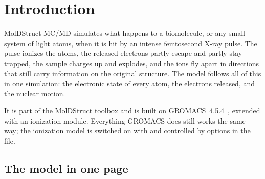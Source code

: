 \chapter{Introduction}
\label{ch:intro}

MolDStruct MC/MD simulates what happens to a biomolecule, or any small system of light atoms, when it is hit by an
intense femtosecond X-ray pulse.
The pulse ionizes the atoms, the released electrons partly escape and partly stay trapped, the sample charges up and
explodes, and the ions fly apart in directions that still carry information on the original structure.
The model follows all of this in one simulation: the electronic state of every atom, the electrons released, and the
nuclear motion.

It is part of the MolDStruct toolbox and is built on GROMACS~4.5.4~\cite{pronk2013}, extended with an ionization
module.
Everything GROMACS does still works the same way; the ionization model is switched on with  and
controlled by  options in the  file.

\section{The model in one page}

